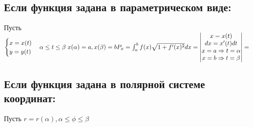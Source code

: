 \documentclass[12pt]{article}
\begin{document}
    \subsection*{Если функция задана в параметрическом виде:}
    Пусть $\begin{cases}
        x=x(t)\\
        y=y(t)
    \end{cases} \alpha \leq t \leq \beta \; x(\alpha)=a,x(\beta)=b\\
    P_x=\int_{a}^{b}f(x)\sqrt{1+f'(x)^2}dx=\begin{vmatrix}
        x=x(t)\\
        dx=x'(t)dt\\
        x=a \Rightarrow t=\alpha\\
        x=b \Rightarrow t=\beta
    \end{vmatrix}=$\\
    \subsection*{Если функция задана в полярной системе координат:}
    Пусть $r=r(\alpha), \alpha \leq \phi \leq \beta$\\
    \\
\end{document}
